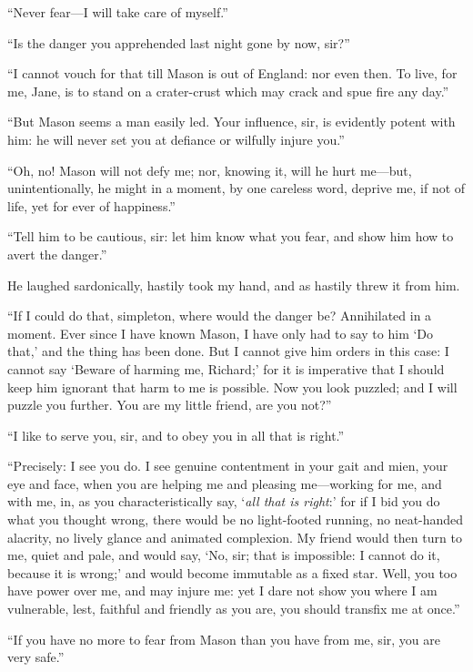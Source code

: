 \enquote{Never fear---I will take care of myself.}

\enquote{Is the danger you apprehended last night gone by now, sir?}

\enquote{I cannot vouch for that till Mason is out of England: nor even
	then. To live, for me, Jane, is to stand on a crater-crust which may
	crack and spue fire any day.}

\enquote{But \Mr{} Mason seems a man easily led. Your influence, sir, is
	evidently potent with him: he will never set you at defiance or wilfully
	injure you.}

\enquote{Oh, no! Mason will not defy me; nor, knowing it, will he hurt
	me---but, unintentionally, he might in a moment, by one careless word,
	deprive me, if not of life, yet for ever of happiness.}

\enquote{Tell him to be cautious, sir: let him know what you fear, and
	show him how to avert the danger.}

He laughed sardonically, hastily took my hand, and as hastily threw it
from him.

\enquote{If I could do that, simpleton, where would the danger be?
	Annihilated in a moment. Ever since I have known Mason, I have only had
	to say to him \enquote{Do that,} and the thing has been done. But I
	cannot give him orders in this case: I cannot say \enquote{Beware of
		harming me, Richard;} for it is imperative that I should keep him
	ignorant that harm to me is possible. Now you look puzzled; and I will
	puzzle you further. You are my little friend, are you not?}

\enquote{I like to serve you, sir, and to obey you in all that is
	right.}

\enquote{Precisely: I see you do. I see genuine contentment in your gait and
	mien, your eye and face, when you are helping me and pleasing
	me---working for me, and with me, in, as you characteristically say,
	\enquote{\emph{all that is right}:} for if I bid you do what you thought wrong,
	there would be no light-footed running, no neat-handed alacrity, no
	lively glance and animated complexion. My friend would then turn to me,
	quiet and pale, and would say, \enquote{No, sir; that is impossible: I
		cannot do it, because it is wrong;} and would become immutable as a
	fixed star. Well, you too have power over me, and may injure me: yet I
	dare not show you where I am vulnerable, lest, faithful and friendly as
	you are, you should transfix me at once.}

\enquote{If you have no more to fear from \Mr{} Mason than you have from
	me, sir, you are very safe.}

